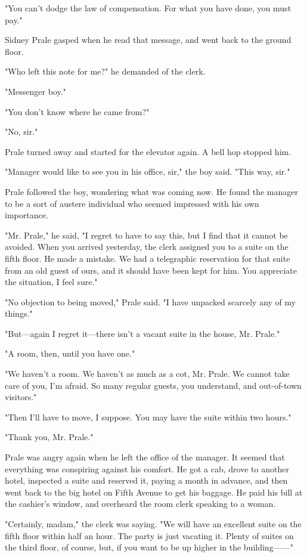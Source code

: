 \documentclass{novel}
\begin{document}
"You can't dodge the law of compensation. For what you have done, you must pay."

Sidney Prale gasped when he read that message, and went back to the ground floor.

"Who left this note for me?" he demanded of the clerk.

"Messenger boy."

"You don't know where he came from?"

"No, sir."

Prale turned away and started for the elevator again. A bell hop stopped him.

"Manager would like to see you in his office, sir," the boy said. "This way, sir."

Prale followed the boy, wondering what was coming now. He found the manager to be a sort of austere individual who seemed impressed with his own importance.

"Mr. Prale," he said, "I regret to have to say this, but I find that it cannot be avoided. When you arrived yesterday, the clerk assigned you to a suite on the fifth floor. He made a mistake. We had a telegraphic reservation for that suite from an old guest of ours, and it should have been kept for him. You appreciate the situation, I feel sure."

"No objection to being moved," Prale said. "I have unpacked scarcely any of my things."

"But---again I regret it---there isn't a vacant suite in the house, Mr. Prale."

"A room, then, until you have one."

"We haven't a room. We haven't as much as a cot, Mr. Prale. We cannot take care of you, I'm afraid. So many regular guests, you understand, and out-of-town visitors."

"Then I'll have to move, I suppose. You may have the suite within two hours."

"Thank you, Mr. Prale."

Prale was angry again when he left the office of the manager. It seemed that everything was conspiring against his comfort. He got a cab, drove to another hotel, inspected a suite and reserved it, paying a month in advance, and then went back to the big hotel on Fifth Avenue to get his baggage. He paid his bill at the cashier's window, and overheard the room clerk speaking to a woman.

"Certainly, madam," the clerk was saying. "We will have an excellent suite on the fifth floor within half an hour. The party is just vacating it. Plenty of suites on the third floor, of course, but, if you want to be up higher in the building------"
\end{document}
